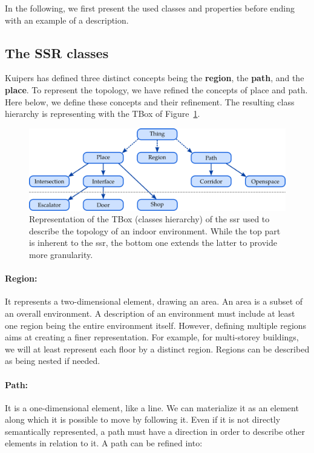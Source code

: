 In the following, we first present the used classes and properties before ending with an example of a description.

\subsection{The SSR classes}

Kuipers has defined three distinct concepts being the \textbf{region}, the \textbf{path}, and the \textbf{place}. To represent the topology, we have refined the concepts of place and path. Here below, we define these concepts and their refinement. The resulting class hierarchy is representing with the TBox of Figure~\ref{fig:chap3_tbox}.

\begin{figure}[ht!]
\centering
\includegraphics[scale=0.4]{figures/chapter3/ssr_tbox.png}
\caption{\label{fig:chap3_tbox} Representation of the TBox (classes hierarchy) of the \acrlong{ssr} used to describe the topology of an indoor environment. While the top part is inherent to the \acrshort{ssr}, the bottom one extends the latter to provide more granularity.}
\end{figure}

\paragraph{Region:} It represents a two-dimensional element, drawing an area. An area is a subset of an overall environment. A description of an environment must include at least one region being the entire environment itself. However, defining multiple regions aims at creating a finer representation. For example, for multi-storey buildings, we will at least represent each floor by a distinct region. Regions can be described as being nested if needed.

\paragraph{Path:} It is a one-dimensional element, like a line. We can materialize it as an element along which it is possible to move by following it. Even if it is not directly semantically represented, a path must have a direction in order to describe other elements in relation to it. A path can be refined into:

